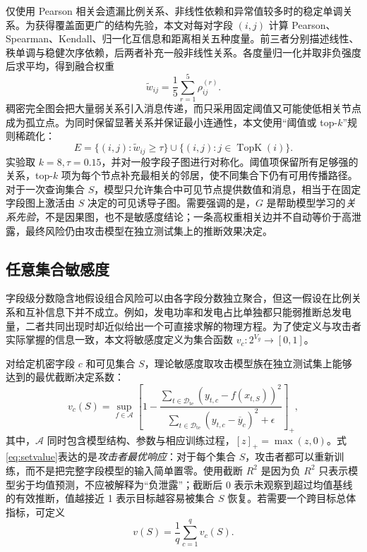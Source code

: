\documentclass[UTF8,a4paper,zihao=5,fontset=fandol]{ctexart}
\newcommand{\Rtwo}{R^2}
\begin{document}
仅使用 Pearson 相关会遗漏比例关系、非线性依赖和异常值较多时的稳定单调关系。为获得覆盖面更广的结构先验，本文对每对字段 $(i,j)$ 计算 Pearson、Spearman、Kendall、归一化互信息和距离相关五种度量。前三者分别描述线性、秩单调与稳健次序依赖，后两者补充一般非线性关系。各度量归一化并取非负强度后求平均，得到融合权重
\begin{equation}
  \widetilde w_{ij}=\frac{1}{5}\sum_{r=1}^{5}\rho^{(r)}_{ij}.
\end{equation}
稠密完全图会把大量弱关系引入消息传递，而只采用固定阈值又可能使低相关节点成为孤立点。为同时保留显著关系并保证最小连通性，本文使用“阈值或 top-$k$”规则稀疏化：
\begin{equation}
  E=\{(i,j):\widetilde w_{ij}\ge \tau\}
  \cup\{(i,j):j\in\operatorname{TopK}(i)\}.
  \label{eq:graph-build}
\end{equation}
实验取 $k=8,\tau=0.15$，并对一般字段子图进行对称化。阈值项保留所有足够强的关系，top-$k$ 项为每个节点补充最相关的邻居，使不同集合下仍有可用传播路径。对于一次查询集合 $S$，模型只允许集合中可见节点提供数值和消息，相当于在固定字段图上激活由 $S$ 决定的可见诱导子图。需要强调的是，$G$ 是帮助模型学习的\emph{关系先验}，不是因果图，也不是敏感度结论；一条高权重相关边并不自动等价于高泄露，最终风险仍由攻击模型在独立测试集上的推断效果决定。

\subsection{任意集合敏感度}

字段级分数隐含地假设组合风险可以由各字段分数独立聚合，但这一假设在比例关系和互补信息下并不成立。例如，发电功率和发电占比单独都只能弱推断总发电量，二者共同出现时却近似给出一个可直接求解的物理方程。为了使定义与攻击者实际掌握的信息一致，本文将敏感度定义为集合函数 $v_c:2^{V_g}\rightarrow[0,1]$。

对给定机密字段 $c$ 和可见集合 $S$，理论敏感度取攻击模型族在独立测试集上能够达到的最优截断决定系数：
\begin{equation}
  v_c(S)=\sup_{f\in\mathcal A}
  \left[
  1-\frac{\sum_{t\in\mathcal D_{\mathrm{te}}}
  (y_{t,c}-f(x_{t,S}))^2}
  {\sum_{t\in\mathcal D_{\mathrm{te}}}
  (y_{t,c}-\overline y_c)^2+\epsilon}
  \right]_+,
  \label{eq:setvalue}
\end{equation}
其中，$\mathcal A$ 同时包含模型结构、参数与相应训练过程，$[z]_+=\max(z,0)$。式\eqref{eq:setvalue}表达的是\emph{攻击者最优响应}：对于每个集合 $S$，攻击者都可以重新训练，而不是把完整字段模型的输入简单置零。使用截断 $\Rtwo$ 是因为负 $\Rtwo$ 只表示模型劣于均值预测，不应被解释为“负泄露”；截断后 0 表示未观察到超过均值基线的有效推断，值越接近 1 表示目标越容易被集合 $S$ 恢复。若需要一个跨目标总体指标，可定义
\begin{equation}
  v(S)=\frac{1}{q}\sum_{c=1}^{q}v_c(S).
\end{equation}
\end{document}
